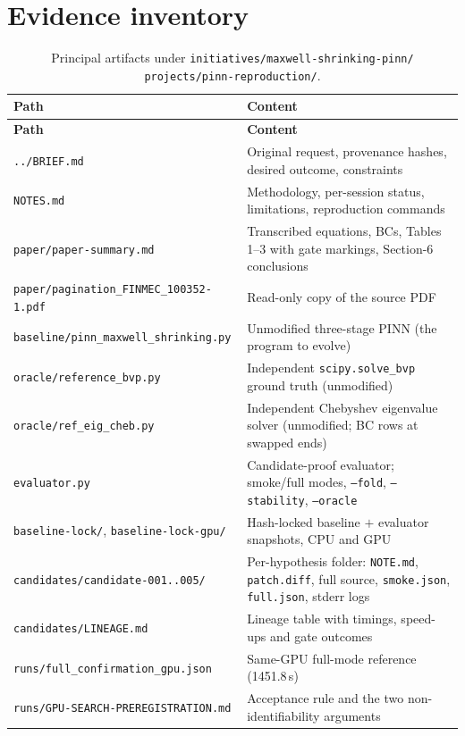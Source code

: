 \documentclass[11pt,a4paper]{article}
\newcommand{\code}[1]{\texttt{\small #1}}
\begin{document}
\section{Evidence inventory}

\begin{longtable}{@{}>{\raggedright\arraybackslash}p{7.0cm}>{\raggedright\arraybackslash}p{8.7cm}@{}}
\caption{Principal artifacts under
\code{initiatives/maxwell-shrinking-pinn/}
\code{projects/pinn-reproduction/}.}\label{tab:inventory}\\
\toprule
\textbf{Path} & \textbf{Content} \\
\midrule
\endfirsthead
\toprule
\textbf{Path} & \textbf{Content} \\
\midrule
\endhead
\code{../BRIEF.md} & Original request, provenance hashes, desired outcome, constraints \\
\code{NOTES.md} & Methodology, per-session status, limitations, reproduction commands \\
\code{paper/paper-summary.md} & Transcribed equations, BCs, Tables 1--3 with gate markings, Section-6 conclusions \\
\code{paper/}\allowbreak\code{pagination\_FINMEC\_100352-1.pdf} & Read-only copy of the source PDF \\
\code{baseline/pinn\_maxwell\_shrinking.py} & Unmodified three-stage PINN (the program to evolve) \\
\code{oracle/reference\_bvp.py} & Independent \code{scipy.solve\_bvp} ground truth (unmodified) \\
\code{oracle/ref\_eig\_cheb.py} & Independent Chebyshev eigenvalue solver (unmodified; BC rows at swapped ends) \\
\code{evaluator.py} & Candidate-proof evaluator; smoke/full modes, \code{--fold}, \code{--stability}, \code{--oracle} \\
\code{baseline-lock/}, \code{baseline-lock-gpu/} & Hash-locked baseline $+$ evaluator snapshots, CPU and GPU \\
\code{candidates/candidate-001..005/} & Per-hypothesis folder: \code{NOTE.md}, \code{patch.diff}, full source, \code{smoke.json}, \code{full.json}, stderr logs \\
\code{candidates/LINEAGE.md} & Lineage table with timings, speed-ups and gate outcomes \\
\code{runs/full\_confirmation\_gpu.json} & Same-GPU full-mode reference (1451.8\,s) \\
\code{runs/GPU-SEARCH-PREREGISTRATION.md} & Acceptance rule and the two non-identifiability arguments \\

\end{longtable}
\end{document}
